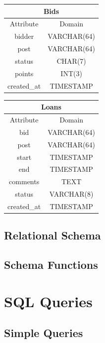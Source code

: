 \begin{center}
\begin{tabular}{|c|c|}
\multicolumn{2}{c}{Bids}\\[2mm]
\hline
Attribute & Domain\\
\hline
bidder & VARCHAR(64)\\
post & VARCHAR(64) \\
status & CHAR(7) \\
points & INT(3) \\
created\_at & TIMESTAMP \\
\hline
\end{tabular}
\end{center}

\begin{center}
\begin{tabular}{|c|c|}
\multicolumn{2}{c}{Loans}\\[2mm]
\hline
Attribute & Domain\\
\hline
bid & VARCHAR(64)\\
post & VARCHAR(64) \\
start & TIMESTAMP \\
end & TIMESTAMP \\
comments & TEXT \\
status & VARCHAR(8) \\
created\_at & TIMESTAMP \\
\hline
\end{tabular}
\end{center}


\subsection{Relational Schema}

\subsection{Schema Functions}

\newpage

\section{SQL Queries}

\subsection{Simple Queries}


